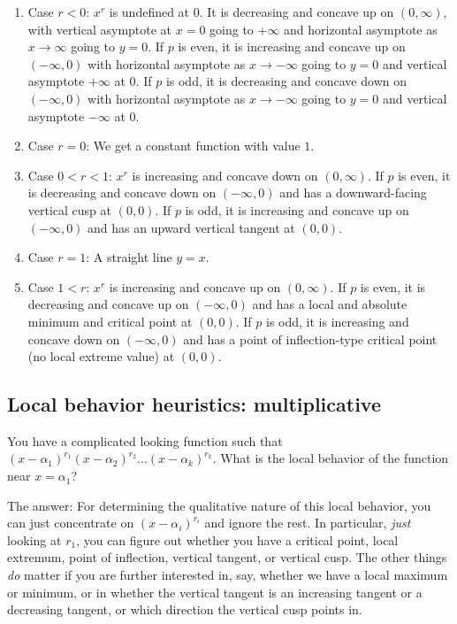 \documentclass[10pt]{amsart}
\begin{document}
\begin{enumerate}
\item Case $r < 0$: $x^r$ is undefined at $0$. It is decreasing and
  concave up on $(0,\infty)$, with vertical asymptote at $x = 0$ going
  to $+\infty$ and horizontal asymptote as $x \to \infty$ going to $y
  = 0$. If $p$ is even, it is increasing and concave up on
  $(-\infty,0)$ with horizontal asymptote as $x \to -\infty$ going to
  $y = 0$ and vertical asymptote $+\infty$ at $0$. If $p$ is odd, it
  is decreasing and concave down on $(-\infty,0)$ with horizontal
  asymptote as $x \to -\infty$ going to $y = 0$ and vertical asymptote
  $-\infty$ at $0$.
\item Case $r = 0$: We get a constant function with value $1$.
\item Case $0 < r < 1$: $x^r$ is increasing and concave down on
  $(0,\infty)$. If $p$ is even, it is decreasing and concave down on
  $(-\infty,0)$ and has a downward-facing vertical cusp at $(0,0)$. If
  $p$ is odd, it is increasing and concave up on $(-\infty,0)$ and has
  an upward vertical tangent at $(0,0)$.
\item Case $r = 1$: A straight line $y = x$.
\item Case $1 < r$: $x^r$ is increasing and concave up on
  $(0,\infty)$. If $p$ is even, it is decreasing and concave up on
  $(-\infty,0)$ and has a local and absolute minimum and critical
  point at $(0,0)$. If $p$ is odd, it is increasing and concave down
  on $(-\infty,0)$ and has a point of inflection-type critical point
  (no local extreme value) at $(0,0)$.
\end{enumerate}

\subsection{Local behavior heuristics: multiplicative}

You have a complicated looking function such that $(x -
\alpha_1)^{r_1}(x - \alpha_2)^{r_2} \dots (x - \alpha_k)^{r_k}$. What
is the local behavior of the function near $x = \alpha_1$?

The answer: For determining the qualitative nature of this local
behavior, you can just concentrate on $(x - \alpha_i)^{r_i}$ and
ignore the rest. In particular, {\em just} looking at $r_1$, you can
figure out whether you have a critical point, local extremum, point of
inflection, vertical tangent, or vertical cusp. The other things {\em
do} matter if you are further interested in, say, whether we have a
local maximum or minimum, or in whether the vertical tangent is an
increasing tangent or a decreasing tangent, or which direction the
vertical cusp points in.
\end{document}

